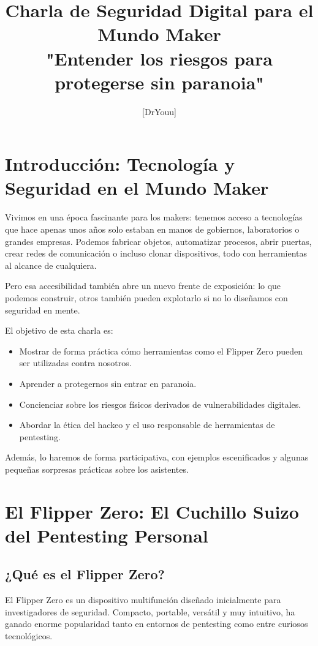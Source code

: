 \documentclass[a4paper,12pt]{article}
\title{\textbf{Charla de Seguridad Digital para el Mundo Maker\\ \large "Entender los riesgos para protegerse sin paranoia"}}
\author{[DrYouu]}
\date{}
\begin{document}
\maketitle

\tableofcontents
\newpage

\section{Introducción: Tecnología y Seguridad en el Mundo Maker}

Vivimos en una época fascinante para los makers: tenemos acceso a tecnologías que hace apenas unos años solo estaban en manos de gobiernos, laboratorios o grandes empresas. Podemos fabricar objetos, automatizar procesos, abrir puertas, crear redes de comunicación o incluso clonar dispositivos, todo con herramientas al alcance de cualquiera.

Pero esa accesibilidad también abre un nuevo frente de exposición: lo que podemos construir, otros también pueden explotarlo si no lo diseñamos con seguridad en mente.

El objetivo de esta charla es:

\begin{itemize}
    \item Mostrar de forma práctica cómo herramientas como el Flipper Zero pueden ser utilizadas contra nosotros.
    \item Aprender a protegernos sin entrar en paranoia.
    \item Concienciar sobre los riesgos físicos derivados de vulnerabilidades digitales.
    \item Abordar la ética del hackeo y el uso responsable de herramientas de pentesting.
\end{itemize}

Además, lo haremos de forma participativa, con ejemplos escenificados y algunas pequeñas sorpresas prácticas sobre los asistentes.

\section{El Flipper Zero: El Cuchillo Suizo del Pentesting Personal}

\subsection{¿Qué es el Flipper Zero?}

El Flipper Zero es un dispositivo multifunción diseñado inicialmente para investigadores de seguridad. Compacto, portable, versátil y muy intuitivo, ha ganado enorme popularidad tanto en entornos de pentesting como entre curiosos tecnológicos.
\end{document}
